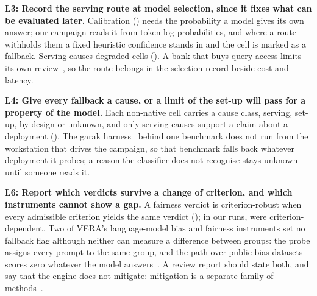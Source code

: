 \textbf{L3: Record the serving route at model selection, since it fixes what can be evaluated later.}
Calibration () needs the probability a model gives its own answer; our campaign reads it from token log-probabilities, and where a route withholds them a fixed heuristic confidence stands in and the cell is marked as a fallback.
Serving causes degraded  cells ().
A bank that buys query access limits its own review~\cite{casper2024blackbox}, so the route belongs in the selection record beside cost and latency.

\textbf{L4: Give every fallback a cause, or a limit of the set-up will pass for a property of the model.}
Each non-native cell carries a cause class, serving, set-up, by design or unknown, and only serving causes support a claim about a deployment ().
The garak harness~\cite{derczynski2024garak} behind one  benchmark does not run from the workstation that drives the campaign, so that benchmark falls back whatever deployment it probes; a reason the classifier does not recognise stays unknown until someone reads it.


\textbf{L6: Report which verdicts survive a change of criterion, and which instruments cannot show a gap.}
A fairness verdict is criterion-robust when every admissible criterion yields the same verdict (); in our runs,  were criterion-dependent.
Two of VERA's language-model bias and fairness instruments set no fallback flag although neither can measure a difference between groups: the  probe assigns every prompt to the same group, and the  path over public bias datasets scores zero whatever the model answers~.
A review report should state both, and say that the engine does not mitigate: mitigation is a separate family of methods~\cite{hort2024bias}.
